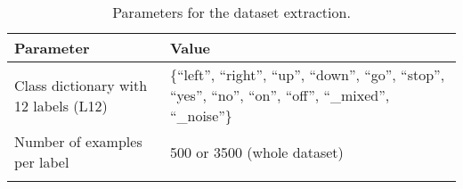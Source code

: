 \begin{table}[ht!]
\small
\begin{center}
\caption{Parameters for the dataset extraction.}
\begin{tabular}{ M{5.8cm}  M{7.2cm}}
\toprule
\textbf{Parameter} & \textbf{Value} \\
\midrule
Class dictionary with 12 labels (L12) & \{\enquote{left},  \enquote{right}, \enquote{up}, \enquote{down}, \enquote{go}, \enquote{stop}, \enquote{yes}, \enquote{no}, \enquote{on}, \enquote{off}, \enquote{\_mixed}, \enquote{\_noise}\}\\
\midrule
Number of examples per label & 500 or 3500 (whole dataset) \\ 
\bottomrule
\label{tab:exp_details_params_dataset}
\end{tabular}
\end{center}
\vspace{-4mm}
\end{table}
\FloatBarrier
\noindent
